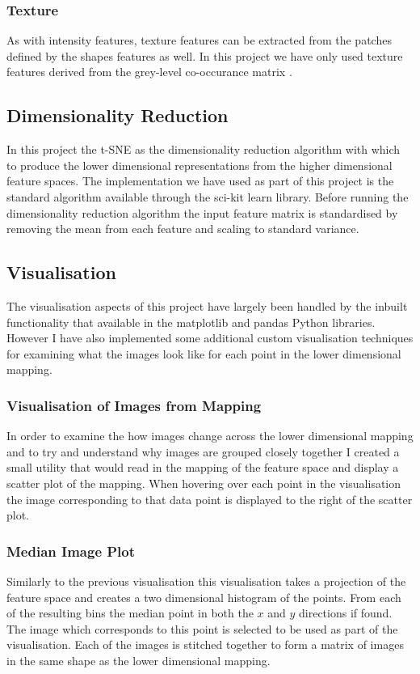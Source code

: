 \subsubsection{Texture}
As with intensity features, texture features can be extracted from the patches defined by the shapes features as well. In this project we have only used texture features derived from the grey-level co-occurance matrix \cite{haralick1973textural}.

\subsection{Dimensionality Reduction}
In this project the t-SNE as the dimensionality reduction algorithm with which to produce the lower dimensional representations from the higher dimensional feature spaces. The implementation we have used as part of this project is the standard algorithm available through the sci-kit learn library. Before running the dimensionality reduction algorithm the input feature matrix is standardised by removing the mean from each feature and scaling to standard variance.

\subsection{Visualisation}
The visualisation aspects of this project have largely been handled by the inbuilt functionality that available in the matplotlib and pandas Python libraries. However I have also implemented some additional custom visualisation techniques for examining what the images look like for each point in the lower dimensional mapping.

\subsubsection{Visualisation of Images from Mapping}
In order to examine the how images change across the lower dimensional mapping and to try and understand why images are grouped closely together I created a small utility that would read in the mapping of the feature space and display a scatter plot of the mapping. When hovering over each point in the visualisation the image corresponding to that data point is displayed to the right of the scatter plot.

\subsubsection{Median Image Plot}
Similarly to the previous visualisation this visualisation takes a projection of the feature space and creates a two dimensional histogram of the points. From each of the resulting bins the median point in both the $x$ and $y$ directions if found. The image which corresponds to this point is selected to be used as part of the visualisation. Each of the images is stitched together to form a matrix of images in the same shape as the lower dimensional mapping.


